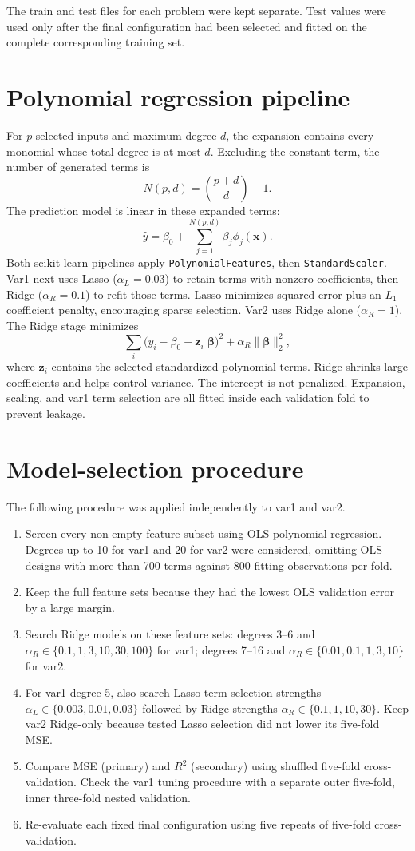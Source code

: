 \documentclass[10pt,a4paper]{article}
\begin{document}
The train and test files for each problem were kept separate. Test values were used only after the final configuration had been selected and fitted on the complete corresponding training set.

\section{Polynomial regression pipeline}
For $p$ selected inputs and maximum degree $d$, the expansion contains every monomial whose total degree is at most $d$. Excluding the constant term, the number of generated terms is
\[
N(p,d)=\binom{p+d}{d}-1.
\]
The prediction model is linear in these expanded terms:
\[
\widehat{y}=\beta_0+\sum_{j=1}^{N(p,d)}\beta_j\phi_j(\mathbf{x}).
\]
Both scikit-learn pipelines apply \texttt{PolynomialFeatures}, then \texttt{StandardScaler}. Var1 next uses Lasso ($\alpha_L=0.03$) to retain terms with nonzero coefficients, then Ridge ($\alpha_R=0.1$) to refit those terms. Lasso minimizes squared error plus an $L_1$ coefficient penalty, encouraging sparse selection. Var2 uses Ridge alone ($\alpha_R=1$). The Ridge stage minimizes
\[
\sum_i\bigl(y_i-\beta_0-\mathbf{z}_i^\top\boldsymbol\beta\bigr)^2
+\alpha_R\lVert\boldsymbol\beta\rVert_2^2,
\]
where $\mathbf{z}_i$ contains the selected standardized polynomial terms. Ridge shrinks large coefficients and helps control variance. The intercept is not penalized. Expansion, scaling, and var1 term selection are all fitted inside each validation fold to prevent leakage.

\newpage\thispagestyle{fancy}
\section{Model-selection procedure}
The following procedure was applied independently to var1 and var2.

\begin{enumerate}
\item Screen every non-empty feature subset using OLS polynomial regression. Degrees up to 10 for var1 and 20 for var2 were considered, omitting OLS designs with more than 700 terms against 800 fitting observations per fold.
\item Keep the full feature sets because they had the lowest OLS validation error by a large margin.
\item Search Ridge models on these feature sets: degrees 3--6 and $\alpha_R\in\{0.1,1,3,10,30,100\}$ for var1; degrees 7--16 and $\alpha_R\in\{0.01,0.1,1,3,10\}$ for var2.
\item For var1 degree 5, also search Lasso term-selection strengths $\alpha_L\in\{0.003,0.01,0.03\}$ followed by Ridge strengths $\alpha_R\in\{0.1,1,10,30\}$. Keep var2 Ridge-only because tested Lasso selection did not lower its five-fold MSE.
\item Compare MSE (primary) and $R^2$ (secondary) using shuffled five-fold cross-validation. Check the var1 tuning procedure with a separate outer five-fold, inner three-fold nested validation.
\item Re-evaluate each fixed final configuration using five repeats of five-fold cross-validation.
\end{enumerate}
\end{document}
